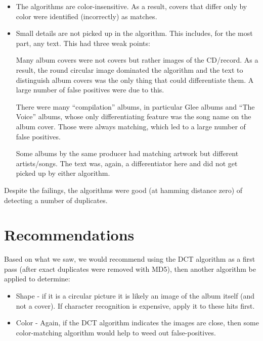 \documentclass[11pt,a4paper,titlepage]{article}
\begin{document}
\begin{itemize}
    \item
        The algorithms are color-insensitive.  As a result, covers that differ
        only by color were identified (incorrectly) as matches.

    \item
        Small details are not picked up in the algorithm.  This includes, for
        the most part, any text.  This had three weak points:

        Many album covers were not covers but rather images of the
        CD/record.  As a result, the round circular image dominated the
        algorithm and the text to distinguish album covers was the only
        thing that could differentiate them.  A large number of false
        positives were due to this.

        There were many ``compilation'' albums, in particular Glee
        albums and ``The Voice'' albums, whose only differentiating
        feature was the song name on the album cover.  Those were
        always matching, which led to a large number of false
        positives.

        Some albums by the same producer had matching artwork but
        different artists/songs.  The text was, again, a differentiator
        here and did not get picked up by either algorithm.
\end{itemize}

Despite the failings, the algorithms were good (at hamming distance zero) of
detecting a number of duplicates.

\section{Recommendations}

Based on what we saw, we would recommend using the DCT algorithm as a first
pass (after exact duplicates were removed with MD5), then another algorithm be
applied to determine:

\begin{itemize}
    \item
        Shape - if it is a circular picture it is likely an image of the album
        itself (and not a cover).  If character recognition is expensive, apply
        it to these hits first.
    \item
        Color - Again, if the DCT algorithm indicates the images are close,
        then some color-matching algorithm would help to weed out
        false-positives.
\end{itemize}
\end{document}
